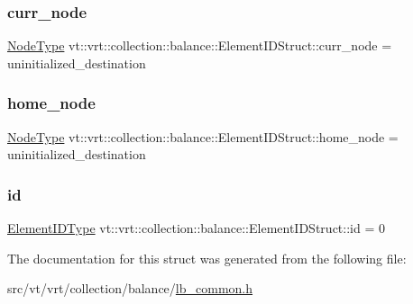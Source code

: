 \subsubsection{\texorpdfstring{curr\+\_\+node}{curr\_node}}
{\footnotesize\ttfamily \hyperlink{namespacevt_a866da9d0efc19c0a1ce79e9e492f47e2}{Node\+Type} vt\+::vrt\+::collection\+::balance\+::\+Element\+I\+D\+Struct\+::curr\+\_\+node = uninitialized\+\_\+destination}

\mbox{\label{structvt_1_1vrt_1_1collection_1_1balance_1_1_element_i_d_struct_ae2615194ecf0f255aff8a38d3d48dd82}} 
\subsubsection{\texorpdfstring{home\+\_\+node}{home\_node}}
{\footnotesize\ttfamily \hyperlink{namespacevt_a866da9d0efc19c0a1ce79e9e492f47e2}{Node\+Type} vt\+::vrt\+::collection\+::balance\+::\+Element\+I\+D\+Struct\+::home\+\_\+node = uninitialized\+\_\+destination}

\mbox{\label{structvt_1_1vrt_1_1collection_1_1balance_1_1_element_i_d_struct_a3acb6937689a2fa83dbaac464fee4c54}} 
\subsubsection{\texorpdfstring{id}{id}}
{\footnotesize\ttfamily \hyperlink{namespacevt_1_1vrt_1_1collection_1_1balance_a14c8d2c972f2913aa3f1636e5be0a120}{Element\+I\+D\+Type} vt\+::vrt\+::collection\+::balance\+::\+Element\+I\+D\+Struct\+::id = 0}



The documentation for this struct was generated from the following file\+:\begin{DoxyCompactItemize}
\item 
src/vt/vrt/collection/balance/\hyperlink{lb__common_8h}{lb\+\_\+common.\+h}\end{DoxyCompactItemize}
